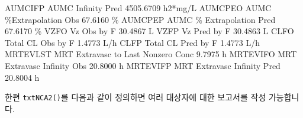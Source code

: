 \documentclass[
  10pt,
]{krantz}
\makeatletter
\newenvironment{Shaded}{\begin{snugshade}}{\end{snugshade}}
\newcommand{\CharTok}[1]{\textcolor[rgb]{0.31,0.60,0.02}{#1}}
\newcommand{\ControlFlowTok}[1]{\textcolor[rgb]{0.13,0.29,0.53}{\textbf{#1}}}
\newcommand{\DataTypeTok}[1]{\textcolor[rgb]{0.13,0.29,0.53}{#1}}
\newcommand{\DecValTok}[1]{\textcolor[rgb]{0.00,0.00,0.81}{#1}}
\newcommand{\ExtensionTok}[1]{#1}
\newcommand{\KeywordTok}[1]{\textcolor[rgb]{0.13,0.29,0.53}{\textbf{#1}}}
\newcommand{\NormalTok}[1]{#1}
\newcommand{\OperatorTok}[1]{\textcolor[rgb]{0.81,0.36,0.00}{\textbf{#1}}}
\newcommand{\StringTok}[1]{\textcolor[rgb]{0.31,0.60,0.02}{#1}}
\newenvironment{kframe}{%
\medskip{}
\setlength{\fboxsep}{.8em}
 \def\at@end@of@kframe{}%
 \ifinner\ifhmode%
  \def\at@end@of@kframe{\end{minipage}}%
  \begin{minipage}{\columnwidth}%
 \fi\fi%
 \def\FrameCommand##1{\hskip\@totalleftmargin \hskip-\fboxsep
 \colorbox{shadecolor}{##1}\hskip-\fboxsep
     \hskip-\linewidth \hskip-\@totalleftmargin \hskip\columnwidth}%
 \MakeFramed {\advance\hsize-\width
   \@totalleftmargin\z@ \linewidth\hsize
   \@setminipage}}%
 {\par\unskip\endMakeFramed%
 \at@end@of@kframe}
\renewenvironment{Shaded}{\begin{kframe}}{\end{kframe}}
\makeatother
\begin{document}
\begin{Shaded}
\begin{Highlighting}[]
\ExtensionTok{AUMCIFP}\NormalTok{    AUMC Infinity Pred                           4505.6709 h2*mg/L}
\ExtensionTok{AUMCPEO}\NormalTok{    AUMC \%Extrapolation Obs                        67.6160 \%}
\ExtensionTok{AUMCPEP}\NormalTok{    AUMC \% Extrapolation Pred                      67.6170 \%}
\ExtensionTok{VZFO}\NormalTok{       Vz Obs by F                                    30.4867 L}
\ExtensionTok{VZFP}\NormalTok{       Vz Pred by F                                   30.4863 L}
\ExtensionTok{CLFO}\NormalTok{       Total CL Obs by F                               1.4773 L/h}
\ExtensionTok{CLFP}\NormalTok{       Total CL Pred by F                              1.4773 L/h}
\ExtensionTok{MRTEVLST}\NormalTok{   MRT Extravasc to Last Nonzero Conc              9.7975 h}
\ExtensionTok{MRTEVIFO}\NormalTok{   MRT Extravasc Infinity Obs                     20.8000 h}
\ExtensionTok{MRTEVIFP}\NormalTok{   MRT Extravasc Infinity Pred                    20.8004 h}
\end{Highlighting}
\end{Shaded}

한편 \texttt{txtNCA2()}를 다음과 같이 정의하면 여러 대상자에 대한 보고서를 작성 가능합니다.

\begin{Shaded}
\end{Shaded}
\end{document}
